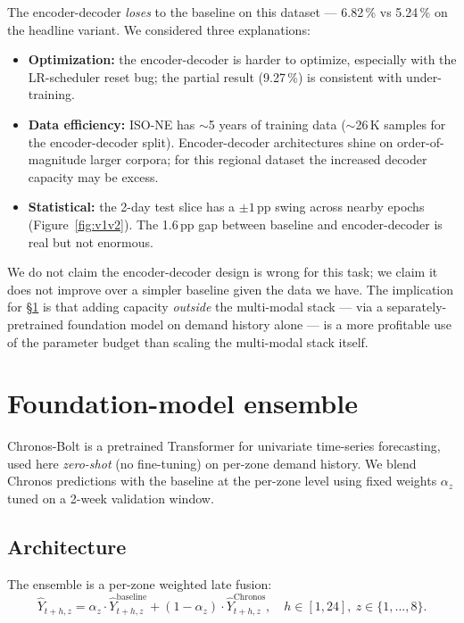 The encoder-decoder \emph{loses} to the baseline on this dataset --- 6.82\,\% vs 5.24\,\% on the headline variant. We considered three explanations:

\begin{itemize}\setlength\itemsep{1pt}
  \item \textbf{Optimization:} the encoder-decoder is harder to optimize, especially with the LR-scheduler reset bug; the partial result (9.27\,\%) is consistent with under-training.
  \item \textbf{Data efficiency:} ISO-NE has $\sim$5 years of training data ($\sim$26\,K samples for the encoder-decoder split). Encoder-decoder architectures shine on order-of-magnitude larger corpora; for this regional dataset the increased decoder capacity may be excess.
  \item \textbf{Statistical:} the 2-day test slice has a $\pm 1$\,pp swing across nearby epochs (Figure~\ref{fig:v1v2}). The 1.6\,pp gap between baseline and encoder-decoder is real but not enormous.
\end{itemize}

We do not claim the encoder-decoder design is wrong for this task; we claim it does not improve over a simpler baseline given the data we have. The implication for \S\ref{sec:ensemble} is that adding capacity \emph{outside} the multi-modal stack --- via a separately-pretrained foundation model on demand history alone --- is a more profitable use of the parameter budget than scaling the multi-modal stack itself.

\section{Foundation-model ensemble}
\label{sec:ensemble}

Chronos-Bolt \citep{ansari2024chronos} is a pretrained Transformer for univariate time-series forecasting, used here \emph{zero-shot} (no fine-tuning) on per-zone demand history. We blend Chronos predictions with the baseline at the per-zone level using fixed weights $\alpha_z$ tuned on a 2-week validation window.

\subsection{Architecture}
\label{sec:ensemble:arch}

The ensemble is a per-zone weighted late fusion:
\begin{equation}
\hat Y_{t+h, z} = \alpha_z \cdot \hat Y^{\text{baseline}}_{t+h, z} + (1 - \alpha_z) \cdot \hat Y^{\text{Chronos}}_{t+h, z}, \quad h \in [1, 24],\ z \in \{1,...,8\}.
\label{eq:ensemble}
\end{equation}

